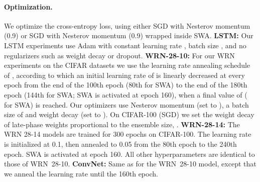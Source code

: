 \documentclass{article} \usepackage{iclr2021_conference,times}
\begin{document}
\paragraph{Optimization.} We optimize the cross-entropy loss, using either SGD with Nesterov momentum (0.9) or SGD with Nesterov momentum (0.9) wrapped inside SWA. \textbf{LSTM:} Our LSTM experiments use Adam with constant learning rate , batch size , and no regularizers such as weight decay or dropout. \textbf{WRN-28-10:} For our WRN experiments on the CIFAR datasets we use the learning rate annealing schedule of \citet{izmailov_averaging_2018}, according to which an initial learning rate of  is linearly decreased at every epoch from the end of the 100th epoch (80th for SWA) to the end of the 180th epoch (144th for SWA; SWA is activated at epoch 160), when a final value of  ( for SWA) is reached. Our optimizers use Nesterov momentum (set to ), a batch size of  and weight decay (set to ). On CIFAR-100 (SGD) we set the weight decay of late-phase weights proportional to the ensemble size, . \textbf{WRN-28-14:} The WRN 28-14 models are trained for 300 epochs on CIFAR-100. The learning rate is initialized at 0.1, then annealed to 0.05 from the 80th epoch to the 240th epoch. SWA is activated at epoch 160. All other hyperparameters are identical to those of WRN~28-10. \textbf{ConvNet:} Same as for the WRN~28-10 model, except that we anneal the learning rate until the 160th epoch.
\end{document}
